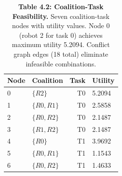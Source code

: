 \begin{table}[H]
\centering
\caption{\textbf{Table 4.2: Coalition-Task Feasibility.} Seven coalition-task nodes with utility values. Node 0 (robot 2 for task 0) achieves maximum utility 5.2094. Conflict graph edges (18 total) eliminate infeasible combinations.}
\label{tab:4-2}
\small
\begin{tabular}{llrl}
\toprule
\textbf{Node} & \textbf{Coalition} & \textbf{Task} & \textbf{Utility} \\
\midrule
\rowcolor{gray!15}
0 & $\{R2\}$ & T0 & 5.2094 \\
1 & $\{R0, R1\}$ & T0 & 2.5858 \\
\rowcolor{gray!15}
2 & $\{R0, R2\}$ & T0 & 2.1487 \\
3 & $\{R1, R2\}$ & T0 & 2.1487 \\
\rowcolor{gray!15}
4 & $\{R0\}$ & T1 & 3.9692 \\
5 & $\{R0, R1\}$ & T1 & 1.1543 \\
\rowcolor{gray!15}
6 & $\{R0, R2\}$ & T1 & 1.4633 \\
\bottomrule
\end{tabular}
\end{table}
